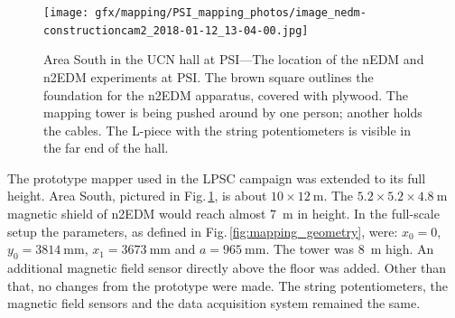 \begin{figure}
  \centering
  \texttt{[image: gfx/mapping/PSI\_mapping\_photos/image\_nedm-constructioncam2\_2018-01-12\_13-04-00.jpg]}
  \caption{Area South in the UCN hall at PSI---The location of the nEDM and n2EDM experiments at PSI\@.
  The brown square outlines the foundation for the n2EDM apparatus, covered with plywood. The mapping tower is being pushed around by one person; another holds the cables. The L-piece with the string potentiometers is visible in the far end of the hall.
  }\label{fig:mapping_photo}
\end{figure}

The prototype mapper used in the LPSC campaign was extended to its full height.
Area South, pictured in Fig.\,\ref{fig:mapping_photo}, is about $10 \times \SI{12}{\metre}$.
The $5.2 \times 5.2 \times \SI{4.8}{\metre}$ magnetic shield of n2EDM would reach almost \SI{7}{\metre} in height.
In the full-scale setup the parameters, as defined in Fig.\,\ref{fig:mapping_geometry}, were:
$x_0 = 0$, $y_0 = \SI{3814}{\milli\metre}$, $x_1 = \SI{3673}{\milli\metre}$ and $a = \SI{965}{\milli\metre}$.
The tower was \SI{8}{\metre} high.
An additional magnetic field sensor directly above the floor was added.
Other than that, no changes from the prototype were made.
The string potentiometers, the magnetic field sensors and the data acquisition system remained the same.

